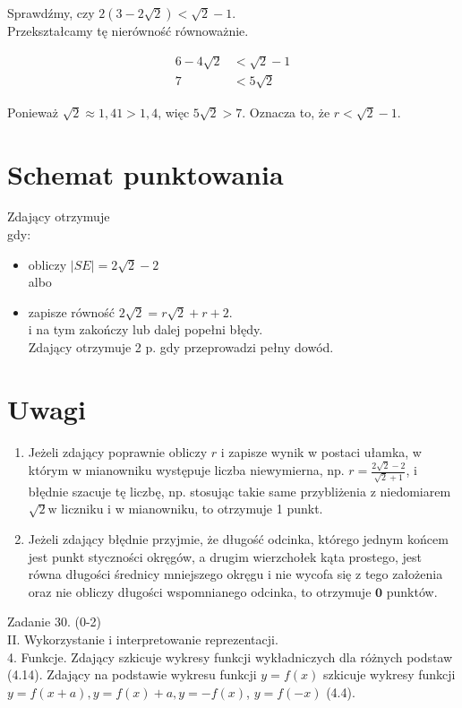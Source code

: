\documentclass[10pt]{article}
\begin{document}
Sprawdźmy, czy $2(3-2 \sqrt{2})<\sqrt{2}-1$.\\
Przekształcamy tę nierówność równoważnie.

$$
\begin{aligned}
6-4 \sqrt{2} & <\sqrt{2}-1 \\
7 & <5 \sqrt{2}
\end{aligned}
$$

Ponieważ $\sqrt{2} \approx 1,41>1,4$, więc $5 \sqrt{2}>7$. Oznacza to, że $r<\sqrt{2}-1$.

\section*{Schemat punktowania}
Zdający otrzymuje\\
gdy:

\begin{itemize}
  \item obliczy $|S E|=2 \sqrt{2}-2$\\
albo
  \item zapisze równość $2 \sqrt{2}=r \sqrt{2}+r+2$.\\
i na tym zakończy lub dalej popełni błędy.\\
Zdający otrzymuje 2 p. gdy przeprowadzi pełny dowód.
\end{itemize}

\section*{Uwagi}
\begin{enumerate}
  \item Jeżeli zdający poprawnie obliczy $r$ i zapisze wynik w postaci ułamka, w którym w mianowniku występuje liczba niewymierna, np. $r=\frac{2 \sqrt{2}-2}{\sqrt{2}+1}$, i błędnie szacuje tę liczbę, np. stosując takie same przybliżenia z niedomiarem $\sqrt{2} \mathrm{w}$ liczniku i w mianowniku, to otrzymuje 1 punkt.
  \item Jeżeli zdający błędnie przyjmie, że długość odcinka, którego jednym końcem jest punkt styczności okręgów, a drugim wierzchołek kąta prostego, jest równa długości średnicy mniejszego okręgu i nie wycofa się z tego założenia oraz nie obliczy długości wspomnianego odcinka, to otrzymuje $\mathbf{0}$ punktów.
\end{enumerate}

Zadanie 30. (0-2)\\
II. Wykorzystanie i interpretowanie reprezentacji.\\
4. Funkcje. Zdający szkicuje wykresy funkcji wykładniczych dla różnych podstaw (4.14). Zdający na podstawie wykresu funkcji $y=f(x)$ szkicuje wykresy funkcji $y=f(x+a), y=f(x)+a, y=-f(x)$, $y=f(-x)$ (4.4).
\end{document}
